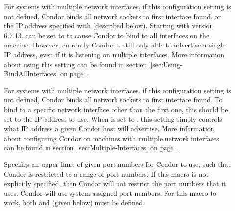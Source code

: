\begin{description}

\item[] \label{param:BindAllInterfaces}
  For systems with multiple network interfaces, if this configuration
  setting is not defined, Condor binds all network sockets to first
  interface found, or the IP address specified with
   (described below).
  Starting with version 6.7.13,  can be
  set to \verb@TRUE@ to cause Condor to bind to all interfaces on the
  machine.
  However, currently Condor is still only able to advertise a single
  IP address, even if it is listening on multiple interfaces.
  More information about using this setting can be found in
  section~\ref{sec:Using-BindAllInterfaces} on
  page~\pageref{sec:Using-BindAllInterfaces}. 

\item[] \label{param:NetworkInterface}
  For systems with multiple network interfaces, if this configuration
  setting is not defined, Condor binds all network sockets to first
  interface found.
  To bind to a specific network interface other than the
  first one, this  should be set to 
  the IP address to use.
  When  is set to \verb@TRUE@, this
  setting simply controls what IP address a given Condor host will
  advertise.
  More information about configuring Condor on machines with multiple
  network interfaces can be found in
  section~\ref{sec:Multiple-Interfaces} on
  page~\pageref{sec:Multiple-Interfaces}.

\item[] \label{param:HighPort}
  Specifies an upper limit of given port numbers for Condor to use,
  such that Condor is restricted to a range of port numbers.
  If this macro is not explicitly specified, then Condor will
  not restrict the port numbers that it uses. Condor will use
  system-assigned port numbers.
  For this macro to work, both  and
   (given below) must be defined.


\end{description}
